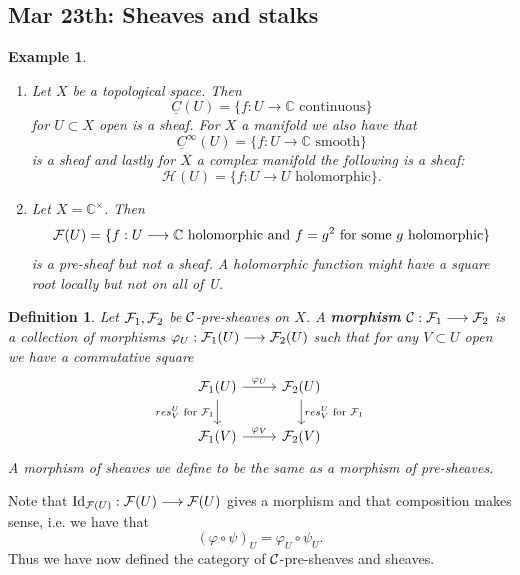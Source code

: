 \documentclass[11pt]{article}
\newtheorem{dfn}[thm]{Definition}
\newtheorem{ex}[thm]{Example}
\newcommand{\calf}{{\cal F}}
\newcommand{\calc}{{\cal C}}
\begin{document}
\subsection{Mar 23th: Sheaves and stalks}
\begin{ex}
    \begin{enumerate}[label=(\arabic*)]
        \item 
        Let $X$ be a topological space. Then
        $$
            \underline C(U) = \{ f : U \longrightarrow \mathbb C \text{ continuous}\}
        $$
        for $U\subset X$ open is a sheaf. For $X$ a manifold we also have that
        $$
        \underline C^\infty(U) = \{ f : U \longrightarrow \mathbb C \text{ smooth}\}
        $$
        is a sheaf and lastly for $X$ a complex manifold the following is a sheaf:
        $$
        \mathcal H(U) = \{ f : U \longrightarrow U \text{ holomorphic}\}. 
        $$
        \item
        Let $X= \mathbb C^\times$. Then
        $$
        \calf(U) = \{f: U \longrightarrow \mathbb C \text{ holomorphic and } f= g^2 \text{ for some $g$ holomorphic} \}
        $$
        is a pre-sheaf but not a sheaf. A holomorphic function might have a square root locally but not on all of U.
    \end{enumerate}
\end{ex}

\begin{dfn}
    Let $\calf_1, \calf_2$ be $\calc$-pre-sheaves on $X$. A \textbf{morphism} $\calc : \calf_1 \longrightarrow \calf_2$ is a collection of morphisms $\varphi_U: \calf_1(U) \longrightarrow \calf_2(U)$ such that for any $V\subset U$ open we have a commutative square
    $$
    \begin{tikzcd}
    \calf_1(U) \arrow[r, "\varphi_U"] \arrow[d, "res^U_V \text{ for } \calf_1"'] & \calf_2(U) \arrow[d, "res^U_V \text{ for } \calf_1"] \\
    \calf_1(V) \arrow[r, "\varphi_V"] & \calf_2(V)
    \end{tikzcd}
    $$
    A morphism of sheaves we define to be the same as a morphism of pre-sheaves.
\end{dfn}
Note that $\operatorname{Id}_{\calf(U)}: \calf(U) \longrightarrow \calf(U)$ gives a morphism and that composition makes sense, i.e. we have that
$$
(\varphi \circ \psi)_U = \varphi_U \circ \psi_U.
$$ 
Thus we have now defined the category of $\calc$-pre-sheaves and sheaves.
\end{document}
